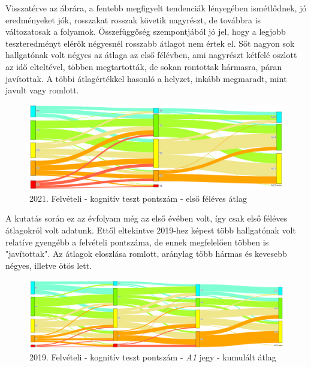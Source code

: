\documentclass[12pt]{article}
\begin{document}
Visszatérve az ábrára, a fentebb megfigyelt tendenciák lényegében ismétlődnek, jó eredményeket jók, rosszakat rosszak követik nagyrészt, de továbbra is változatosak a folyamok. Összefüggőség szempontjából jó jel, hogy a legjobb teszteredményt elérők négyesnél rosszabb átlagot nem értek el. Sőt nagyon sok hallgatónak volt négyes az átlaga az első félévben, ami nagyrészt kétfelé oszlott az idő elteltével, többen megtartották, de sokan rontottak hármasra, páran javítottak. A többi átlagértékkel hasonló a helyzet, inkább megmaradt, mint javult vagy romlott.


\begin{figure}[H]
\centering
\includegraphics[scale=0.6]{kepek/2021_felvi_teszt_atlag.png}
\caption{2021. Felvételi - kognitív teszt pontszám - első féléves átlag}
\label{fig:2021_felvi_teszt_atlag}
\end{figure}

A kutatás során ez az évfolyam még az első évében volt, így csak első féléves átlagokról volt adatunk. Ettől eltekintve 2019-hez képest több hallgatónak volt relatíve gyengébb a felvételi pontszáma, de ennek megfelelően többen is "javítottak". Az átlagok eloszlása romlott, aránylag több hármas és kevesebb négyes, illetve ötös lett. 

\begin{figure}[H]
\centering
\includegraphics[scale=0.5]{kepek/2019_felvi_teszt_a1_kumatl.png}
\caption{2019. Felvételi - kognitív teszt pontszám - \textit{A1} jegy - kumulált átlag}
\label{fig:2019_felvi_teszt_a1_kumatl}
\end{figure}
\end{document}
